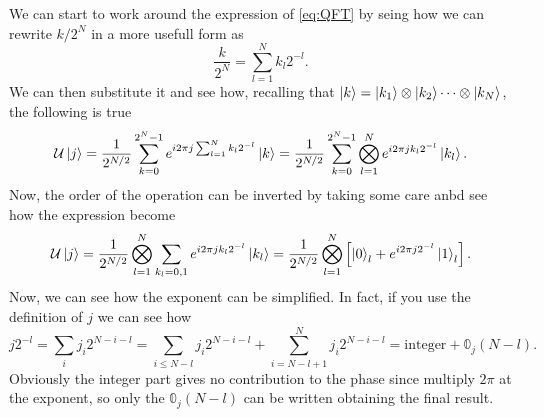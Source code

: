 {
    We can start to work around the expression of \eqref{eq:QFT} by seing how we can rewrite $k/2^{N}$ in a more usefull form as
    \begin{equation}
        \frac{k}{2^N} = \sum_{l=1}^N k_l 2^{-l}.
    \end{equation}
    We can then substitute it and see how, recalling that $\ket{k} = \ket{k_1}\otimes\ket{k_2}\dots\otimes\ket{k_N}$, the following is true
    \begin{equation}
        \mathcal{U}\ket{j} = \frac{1}{2^{N/2}} \sum_{k=0}^{2^N-1} e^{i2\pi j\sum_{l=1}^N k_l 2^{-l}} \ket{k} = \frac{1}{2^{N/2}}\sum_{k=0}^{2^N - 1}\bigotimes_{l=1}^N e^{i2\pi jk_l 2^{-l}}\ket{k_l}.
    \end{equation}
    Now, the order of the operation can be inverted by taking some care anbd see how the expression become
    \begin{equation}
        \mathcal{U}\ket{j} = \frac{1}{2^{N/2}}\bigotimes_{l=1}^N \sum_{k_l = 0, 1}e^{i2\pi jk_l 2^{-l}}\ket{k_l} = \frac{1}{2^{N/2}}\bigotimes_{l=1}^N\left[ \ket{0}_l + e^{i2\pi j2^{-l}}\ket{1}_l \right].
    \end{equation}
    Now, we can see how the exponent can be simplified. In fact, if you use the definition of $j$ we can see how
    \begin{equation}
        j2^{-l} = \sum_i j_i 2^{N - i - l} = \sum_{i \le N-l} j_i 2^{N - i - l} + \sum_{i = N-l+1}^N j_i 2^{N - i - l} = \text{integer} + \mathbb{0}_j(N-l).
    \end{equation}
    Obviously the integer part gives no contribution to the phase since multiply $2\pi$ at the exponent, so only the $\mathbb{0}_j(N-l)$ can be written obtaining the final result.
}


